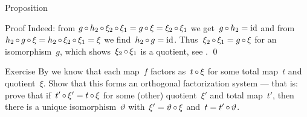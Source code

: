 \documentclass[b]{subfiles}
\begin{document}
\begin{parsec}
\begin{point}{Proposition}
\begin{point}{Proof}
Indeed: from $g \mathop{\circ} h_2 \mathop{\circ} \xi_2 \mathop{\circ} \xi_1= g \mathop{\circ} \xi = \xi_2 \mathop{\circ} \xi_1$
    we get~$g \mathop{\circ} h_2 = \operatorname{id}$
    and from~$h_2 \mathop{\circ} g \mathop{\circ} \xi = h_2 \mathop{\circ} \xi_2 \mathop{\circ} \xi_1 = \xi$
    we find~$h_2 \mathop{\circ} g = \operatorname{id}$.
Thus~$\xi_2 \mathop{\circ} \xi_1 = g \mathop{\circ} \xi$ for an isomorphism~$g$,
which shows~$\xi_2 \mathop{\circ} \xi_1$ is a quotient, see . \qed
\end{point}
\end{point}
\begin{point}{Exercise}
By  we know that each
    map~$f$ factors as~$t \mathop{\circ} \xi$
    for some total map~$t$ and quotient~$\xi$.
Show that this forms an orthogonal factorization system ---
    that is: prove that if~$t' \mathop{\circ} \xi' = t \mathop{\circ} \xi$
    for some (other) quotient~$\xi'$ and total map~$t'$,
    then there is a unique isomorphism~$\vartheta$
    with~$\xi' = \vartheta \mathop{\circ} \xi$
    and~$t = t' \mathop{\circ} \vartheta$.
\end{point}
\end{parsec}
\end{document}
